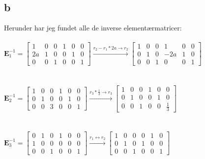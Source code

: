 \documentclass{article}
\begin{document}
\subsection*{b}
Herunder har jeg fundet alle de inverse elementærmatricer:
\\
\\
$\mathbf{E}_1^{-1} = \left[\begin{array}{ccc|ccc}1 & 0 & 0 & 1 & 0 & 0 \\ 2 a & 1 & 0 & 0 & 1 & 0 \\ 0 & 0 & 1 & 0 & 0 & 1\end{array}\right] \stackrel{r_2-r_1*2a \rightarrow r_2}{\longrightarrow} \left[\begin{array}{ccc|ccc}1 & 0 & 0 & 1 & 0 & 0 \\ 0 & 1 & 0 & -2 a & 1 & 0 \\ 0 & 0 & 1 & 0 & 0 & 1\end{array}\right]$
\\
\\
\\
$\mathbf{E}_2^{-1} = \left[\begin{array}{lll|lll}1 & 0 & 0 & 1 & 0 & 0 \\ 0 & 1 & 0 & 0 & 1 & 0 \\ 0 & 0 & 3 & 0 & 0 & 1\end{array}\right] \stackrel{r_3*\frac{1}{3} \rightarrow r_3}{\longrightarrow} \left[\begin{array}{ccc|ccc}1 & 0 & 0 & 1 & 0 & 0 \\ 0 & 1 & 0 & 0 & 1 & 0 \\ 0 & 0 & 1 & 0 & 0 & \frac{1}{3}\end{array}\right]$
\\
\\
\\
$\mathbf{E}_3^{-1} = \left[\begin{array}{lll|lll}
0 & 1 & 0 & 1 & 0 & 0 \\
1 & 0 & 0 & 0 & 0 & 0 \\
0 & 0 & 1 & 0 & 0 & 1
\end{array}\right] \stackrel{r_1 \leftrightarrow r_2}{\longrightarrow} \left[\begin{array}{lll|lll}1 & 0 & 0 & 0 & 1 & 0 \\ 0 & 1 & 0 & 1 & 0 & 0 \\ 0 & 0 & 1 & 0 & 0 & 1\end{array}\right]$
\\
\\
\\
\end{document}
